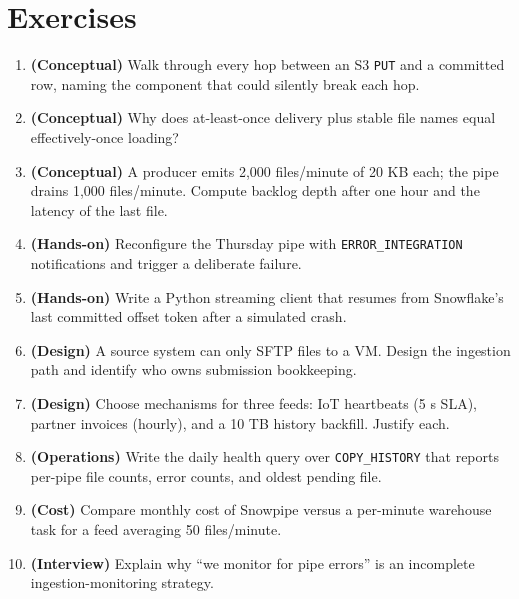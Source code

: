 \section{Exercises}
\begin{enumerate}
    \item \textbf{(Conceptual)} Walk through every hop between an S3 \texttt{PUT} and a committed row, naming the component that could silently break each hop.
    \item \textbf{(Conceptual)} Why does at-least-once delivery plus stable file names equal effectively-once loading?
    \item \textbf{(Conceptual)} A producer emits 2,000 files/minute of 20 KB each; the pipe drains 1,000 files/minute. Compute backlog depth after one hour and the latency of the last file.
    \item \textbf{(Hands-on)} Reconfigure the Thursday pipe with \texttt{ERROR\_INTEGRATION} notifications and trigger a deliberate failure.
    \item \textbf{(Hands-on)} Write a Python streaming client that resumes from Snowflake's last committed offset token after a simulated crash.
    \item \textbf{(Design)} A source system can only SFTP files to a VM. Design the ingestion path and identify who owns submission bookkeeping.
    \item \textbf{(Design)} Choose mechanisms for three feeds: IoT heartbeats (5 s SLA), partner invoices (hourly), and a 10 TB history backfill. Justify each.
    \item \textbf{(Operations)} Write the daily health query over \texttt{COPY\_HISTORY} that reports per-pipe file counts, error counts, and oldest pending file.
    \item \textbf{(Cost)} Compare monthly cost of Snowpipe versus a per-minute warehouse task for a feed averaging 50 files/minute.
    \item \textbf{(Interview)} Explain why ``we monitor for pipe errors'' is an incomplete ingestion-monitoring strategy.
\end{enumerate}
